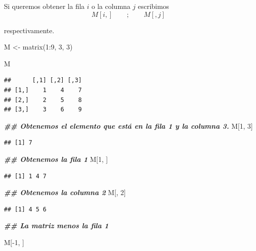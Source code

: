 \documentclass[
  12pt,
]{book}
\newenvironment{Shaded}{\begin{snugshade}}{\end{snugshade}}
\newcommand{\DecValTok}[1]{\textcolor[rgb]{0.00,0.00,0.81}{#1}}
\newcommand{\DocumentationTok}[1]{\textcolor[rgb]{0.56,0.35,0.01}{\textbf{\textit{#1}}}}
\newcommand{\FunctionTok}[1]{\textcolor[rgb]{0.00,0.00,0.00}{#1}}
\newcommand{\NormalTok}[1]{#1}
\newcommand{\OtherTok}[1]{\textcolor[rgb]{0.56,0.35,0.01}{#1}}
\newcommand{\SpecialCharTok}[1]{\textcolor[rgb]{0.00,0.00,0.00}{#1}}
\begin{document}
Si queremos obtener la fila \(i\) o la columna \(j\) escribimos
\[
M[i,] \qquad; \qquad M[,j]
\]

respectivamente.

\begin{Shaded}
\begin{Highlighting}[]
\NormalTok{M }\OtherTok{\textless{}{-}} \FunctionTok{matrix}\NormalTok{(}\DecValTok{1}\SpecialCharTok{:}\DecValTok{9}\NormalTok{, }\DecValTok{3}\NormalTok{, }\DecValTok{3}\NormalTok{)}

\NormalTok{M}
\end{Highlighting}
\end{Shaded}

\begin{verbatim}
##      [,1] [,2] [,3]
## [1,]    1    4    7
## [2,]    2    5    8
## [3,]    3    6    9
\end{verbatim}

\begin{Shaded}
\begin{Highlighting}[]
\DocumentationTok{\#\# Obtenemos el elemento que está en la fila 1 y la columna 3.}
\NormalTok{M[}\DecValTok{1}\NormalTok{, }\DecValTok{3}\NormalTok{]}
\end{Highlighting}
\end{Shaded}

\begin{verbatim}
## [1] 7
\end{verbatim}

\begin{Shaded}
\begin{Highlighting}[]
\DocumentationTok{\#\# Obtenemos la fila 1}
\NormalTok{M[}\DecValTok{1}\NormalTok{, ]}
\end{Highlighting}
\end{Shaded}

\begin{verbatim}
## [1] 1 4 7
\end{verbatim}

\begin{Shaded}
\begin{Highlighting}[]
\DocumentationTok{\#\# Obtenemos la columna 2}
\NormalTok{M[, }\DecValTok{2}\NormalTok{]}
\end{Highlighting}
\end{Shaded}

\begin{verbatim}
## [1] 4 5 6
\end{verbatim}

\begin{Shaded}
\begin{Highlighting}[]
\DocumentationTok{\#\# La matriz menos la fila 1}

\NormalTok{M[}\SpecialCharTok{{-}}\DecValTok{1}\NormalTok{, ]}
\end{Highlighting}
\end{Shaded}
\end{document}

